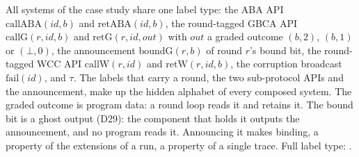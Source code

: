 \begin{definition}
  \label{def:aba-labels}
  \leanok
  All systems of the case study share one label type: the ABA API $\mathrm{callABA}(id,b)$ and $\mathrm{retABA}(id,b)$, the round-tagged GBCA API $\mathrm{callG}(r,id,b)$ and $\mathrm{retG}(r,id,out)$ with $out$ a graded outcome $(b,2)$, $(b,1)$ or $(\bot,0)$, the announcement $\mathrm{boundG}(r,b)$ of round $r$'s bound bit, the round-tagged WCC API $\mathrm{callW}(r,id)$ and $\mathrm{retW}(r,id,b)$, the corruption broadcast $\mathrm{fail}(id)$, and $\tau$.
  The labels that carry a round, the two sub-protocol APIs and the announcement, make up the hidden alphabet of every composed system.
  The graded outcome is program data: a round loop reads it and retains it.
  The bound bit is a ghost output (D29): the component that holds it outputs the announcement, and no program reads it.
  Announcing it makes binding, a property of the extensions of a run, a property of a single trace.
  Full label type: .
\end{definition}
